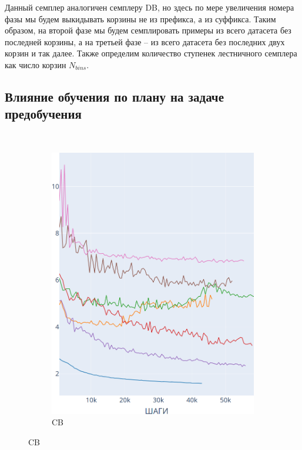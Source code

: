 \documentclass{spbau-diploma}
\begin{document}
\begin{enumerate}
	Данный семплер аналогичен семплеру DB, но здесь по мере увеличения номера фазы мы будем выкидывать корзины не из префикса, а из суффикса. Таким образом, на второй фазе мы будем семплировать примеры из всего датасета без последней корзины, а на третьей фазе -- из всего датасета без последних двух корзин и так далее. Также определим количество ступенек лестничного семплера как число корзин $N_{bins}$.
\end{enumerate}

\pagebreak
\subsection{Влияние обучения по плану на задаче предобучения}
\ 

\begin{figure}[h]
	\centering
	\begin{subfigure}{.3\textwidth}
		\centering
		\includegraphics[scale=0.2]{BooksCorpus_CB}
		\caption{CB}
		\label{fig:BooksCorpus_graphs_CB}
	\end{subfigure}

\end{figure}
\end{document}
